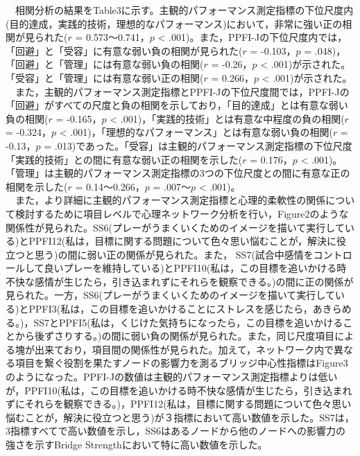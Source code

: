 \documentclass[12pt,a4paper,xelatex,ja=standard]{bxjsarticle}
\begin{document}
　相関分析の結果をTable3に示す。主観的パフォーマンス測定指標の下位尺度内(目的達成，実践的技術，理想的なパフォーマンス)において，非常に強い正の相関が見られた(\(\mathit{r}\)
= 0.573〜0.741，\(\mathit{p}\) \textless{}
.001)。また，PPFI-Jの下位尺度内では，「回避」と「受容」に有意な弱い負の相関が見られた(\(\mathit{r}\)
= -0.103，\(\mathit{p}\) =
.048)，「回避」と「管理」には有意な弱い負の相関(\(\mathit{r}\) =
-0.26，\(\mathit{p}\) \textless{}
.001)が示された。「受容」と「管理」には有意な弱い正の相関(\(\mathit{r}\)
= 0.266，\(\mathit{p}\) \textless{} .001)が示された。\\
　また，主観的パフォーマンス測定指標とPPFI-Jの下位尺度間では，PPFI-Jの「回避」がすべての尺度と負の相関を示しており，「目的達成」とは有意な弱い負の相関(\(\mathit{r}\)
= -0.165，\(\mathit{p}\) \textless{}
.001)，「実践的技術」とは有意な中程度の負の相関(\(\mathit{r}\) =
-0.324，\(\mathit{p}\) \textless{}
.001)，「理想的なパフォーマンス」とは有意な弱い負の相関(\(\mathit{r}\) =
-0.13，\(\mathit{p}\) =
.013)であった。「受容」は主観的パフォーマンス測定指標の下位尺度「実践的技術」との間に有意な弱い正の相関を示した(\(\mathit{r}\)
= 0.176，\(\mathit{p}\) \textless{}
.001)。「管理」は主観的パフォーマンス測定指標の3つの下位尺度との間に有意な正の相関を示した(\(\mathit{r}\)
= 0.14〜0.266，\(\mathit{p}\) = .007〜\(\mathit{p}\) \textless{}
.001)。\\
　また，より詳細に主観的パフォーマンス測定指標と心理的柔軟性の関係について検討するために項目レベルで心理ネットワーク分析を行い，Figure2のような関係性が見られた。SS6(プレーがうまくいくためのイメージを描いて実行している)とPPFI12(私は，目標に関する問題について色々思い悩むことが，解決に役立つと思う)の間に弱い正の関係が見られた。また，
SS7(試合中感情をコントロールして良いプレーを維持している)とPPFI10(私は，この目標を追いかける時不快な感情が生じたら，引き込まれずにそれらを観察できる。)の間に正の関係が見られた。一方，SS6(プレーがうまくいくためのイメージを描いて実行している)とPPFI3(私は，この目標を追いかけることにストレスを感じたら，あきらめる。)，SS7とPPFI5(私は，くじけた気持ちになったら，この目標を追いかけることから後ずさりする。)の間に弱い負の関係が見られた。また，同じ尺度項目による塊が出来ており，項目間の関係性が見られた。加えて，ネットワーク内で異なる項目を繋ぐ役割を果たすノードの影響力を測るブリッジ中心性指標はFigure3のようになった。PPFI-Jの数値は主観的パフォーマンス測定指標よりは低いが，PPFI10(私は，この目標を追いかける時不快な感情が生じたら，引き込まれずにそれらを観察できる。)，PPFI12(私は，目標に関する問題について色々思い悩むことが，解決に役立つと思う)が３指標において高い数値を示した。SS7は，3指標すべてで高い数値を示し，SS6はあるノードから他のノードへの影響力の強さを示すBridge
Strengthにおいて特に高い数値を示した。
\end{document}
